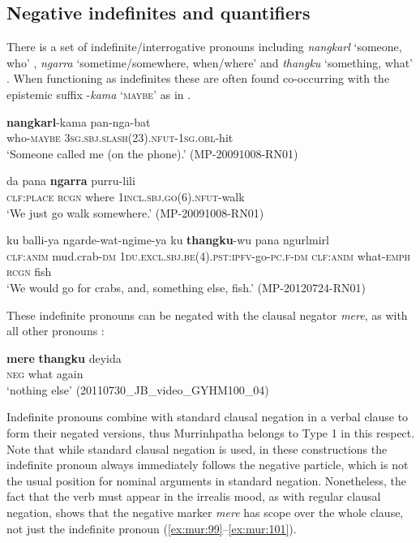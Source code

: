\documentclass[output=paper,colorlinks,citecolor=brown]{langscibook}
\begin{document}
\subsection{Negative indefinites and quantifiers} \label{sec:mur:3.2}

There is a set of indefinite/interrogative pronouns including \textit{nangkarl} ‘someone, who’ , \textit{ngarra} ‘sometime/somewhere, when/where’  and \textit{thangku} ‘something, what’ . When functioning as indefinites these are often found co-occurring with the epistemic suffix -\textit{kama} ‘\textsc{maybe}’ as in .

\ea\label{ex:mur:95}
    \gll \textbf{nangkarl}{}-kama pan-nga-bat\\
         who{}-\textsc{maybe} \textsc{3sg.sbj.slash(23).nfut-1sg.obl-}hit\\
    \glt ‘Someone called me (on the phone).’ (MP-20091008-RN01)
\z

\ea\label{ex:mur:96}
    \gll da pana \textbf{ngarra} purru-lili\\
         \textsc{clf:place} \textsc{rcgn} where \textsc{1incl.sbj.go(6).nfut}{}-walk\\
    \glt ‘We just go walk somewhere.’ (MP-20091008-RN01)
\z 

\ea\label{ex:mur:97}
    \gll ku balli-ya ngarde-wat-ngime-ya ku \textbf{thangku}{}-wu pana ngurlmirl\\
         \textsc{clf:anim} mud.crab-\textsc{dm} \textsc{1du.excl.sbj.be(4).pst:ipfv}{}-go-\textsc{pc.f-dm} \textsc{clf:anim} what{}-\textsc{emph} \textsc{rcgn} fish \\
    \glt ‘We would go for crabs, and, something else, fish.’ (MP-20120724-RN01)
\z 

These indefinite pronouns can be negated with the clausal negator \textit{mere}, as with all other pronouns :

\ea\label{ex:mur:98}
    \gll \textbf{mere} \textbf{thangku} deyida\\
          \textsc{neg} what again\\
    \glt ‘nothing else’ (20110730\_JB\_video\_GYHM100\_04)
\z 

Indefinite pronouns combine with standard clausal negation in a verbal clause to form their negated versions, thus Murrinhpatha belongs to  Type 1 in this respect. Note that while standard clausal negation is used, in these constructions the indefinite pronoun always immediately follows the negative particle, which is not the usual position for nominal arguments in standard negation. Nonetheless, the fact that the verb must appear in the irrealis mood, as with regular clausal negation, shows that the negative marker \textit{mere} has scope over the whole clause, not just the indefinite pronoun (\ref{ex:mur:99}--\ref{ex:mur:101}).
\end{document}

